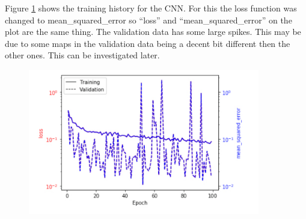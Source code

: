 \documentclass{article}
\begin{document}
		Figure \ref{fig:adam_training} shows the training history for the CNN.  For this the loss function was changed to mean\_squared\_error so ``loss'' and ``mean\_squared\_error'' on the plot are the same thing.  The validation data has some large spikes.  This may be due to some maps in the validation data being a decent bit different then the other ones.  This can be investigated later.

		\begin{figure}[H]
			\centering
			\includegraphics[width=0.9\textwidth]{adam_training.pdf}
			\caption{}
			\label{fig:adam_training}
		\end{figure}
\end{document}
